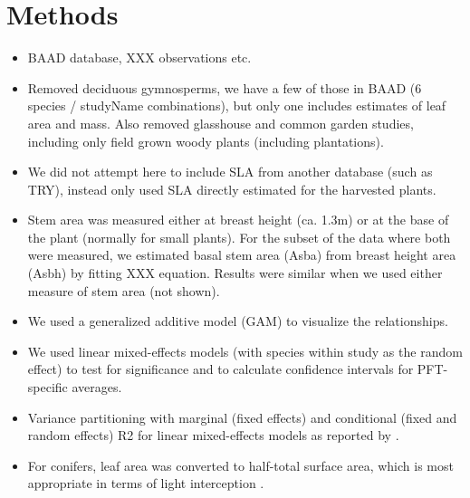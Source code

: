 \documentclass[a4paper]{article}\usepackage[]{graphicx}\usepackage[]{color}
\begin{document}
\begin{enumerate}
\end{enumerate}


\section{Methods}

\begin{itemize}
\item BAAD database, XXX observations etc.

\item Removed deciduous gymnosperms, we have a few of those in BAAD (6 species / studyName combinations), but only one includes estimates of leaf area and mass. Also removed glasshouse and common garden studies, including only field grown woody plants (including plantations).

\item We did not attempt here to include SLA from another database (such as TRY), instead only used SLA directly estimated for the harvested plants.

\item Stem area was measured either at breast height (ca. 1.3m) or at the base of the plant (normally for small plants). For the subset of the data where both were measured, we estimated basal stem area (Asba) from breast height area (Asbh) by fitting XXX equation. Results were similar when we used either measure of stem area (not shown).

\item We used a generalized additive model (GAM) to visualize the relationships. 

\item We used linear mixed-effects models (with species within study as the random effect) to test for significance and to calculate confidence intervals for  PFT-specific averages.

\item Variance partitioning with marginal (fixed effects) and conditional (fixed and random effects) R2 for linear mixed-effects models as reported by \cite{nakagawa_general_2013}.

\item For conifers, leaf area was converted to half-total surface area, which is most appropriate in terms of light interception  \cite{lang_application_1991, chen_defining_1992}.
\end{itemize}
\end{document}
